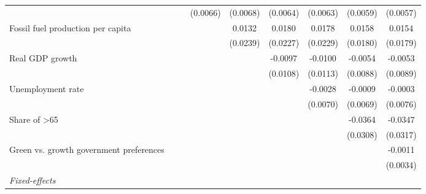 \begin{table}[htbp]
\begin{tabular}{lcccccccc}
                                                &                 &                       & (0.0066)       & (0.0068)       & (0.0064)        & (0.0063)        & (0.0059)        & (0.0057)\\   
      Fossil fuel production per capita         &                 &                       &                & 0.0132         & 0.0180          & 0.0178          & 0.0158          & 0.0154\\   
                                                &                 &                       &                & (0.0239)       & (0.0227)        & (0.0229)        & (0.0180)        & (0.0179)\\   
      Real GDP growth                           &                 &                       &                &                & -0.0097         & -0.0100         & -0.0054         & -0.0053\\   
                                                &                 &                       &                &                & (0.0108)        & (0.0113)        & (0.0088)        & (0.0089)\\   
      Unemployment rate                         &                 &                       &                &                &                 & -0.0028         & -0.0009         & -0.0003\\   
                                                &                 &                       &                &                &                 & (0.0070)        & (0.0069)        & (0.0076)\\   
      Share of >65                              &                 &                       &                &                &                 &                 & -0.0364         & -0.0347\\   
                                                &                 &                       &                &                &                 &                 & (0.0308)        & (0.0317)\\   
      Green vs. growth government preferences   &                 &                       &                &                &                 &                 &                 & -0.0011\\   
                                                &                 &                       &                &                &                 &                 &                 & (0.0034)\\   
      \midrule
      \emph{Fixed-effects}\\

\end{tabular}
\end{table}
